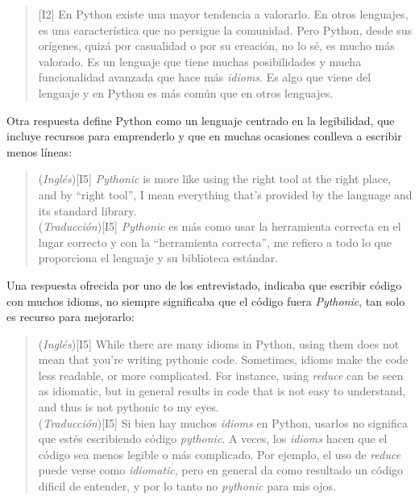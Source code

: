\documentclass[a4paper, 12pt]{book}
\begin{document}
\begin{quote}
\small
    [I2] En Python existe una mayor tendencia a valorarlo. En otros lenguajes, es una característica que no persigue la comunidad. Pero Python, desde sus orígenes, quizá por casualidad o por su creación, no lo sé, es mucho más valorado. Es un lenguaje que tiene muchas posibilidades y mucha funcionalidad avanzada que hace más \textit{idioms}. Es algo que viene del lenguaje y en Python es más común que en otros lenguajes.

\end{quote}

Otra respuesta define Python como un lenguaje centrado en la legibilidad, que incluye recursos para emprenderlo y que en muchas ocasiones conlleva a escribir menos líneas:

\begin{quote}
\small
    (\textit{Inglés})[I5] \textit{Pythonic} is more like using the right tool at the right place, and by ``right tool'', I mean everything that's provided by the language and its standard library.\\
    (\textit{Traducción})[I5] \textit{Pythonic} es más como usar la herramienta correcta en el lugar correcto y con la ``herramienta correcta'', me refiero a todo lo que proporciona el lenguaje y su biblioteca estándar.

\end{quote}

Una respuesta ofrecida por uno de los entrevistado, indicaba que escribir código con muchos idioms, no siempre significaba que el código fuera \textit{Pythonic}, tan solo es recurso para mejorarlo:

\begin{quote}
\small
        (\textit{Inglés})[I5] While there are many idioms in Python, using them does not mean that you're writing pythonic code. Sometimes, idioms make the code less readable, or more complicated. For instance, using \emph{reduce} can be seen as idiomatic, but in general results in code that is not easy to understand, and thus is not pythonic to my eyes.\\
        (\textit{Traducción})[I5] Si bien hay muchos \textit{idioms} en Python, usarlos no significa que estés escribiendo código \textit{pythonic}. A veces, los \textit{idioms} hacen que el código sea menos legible o más complicado. Por ejemplo, el uso de \textit{reduce} puede verse como \textit{idiomatic}, pero en general da como resultado un código dificil de entender, y por lo tanto no \textit{pythonic} para mis ojos.
\end{quote}
\end{document}
